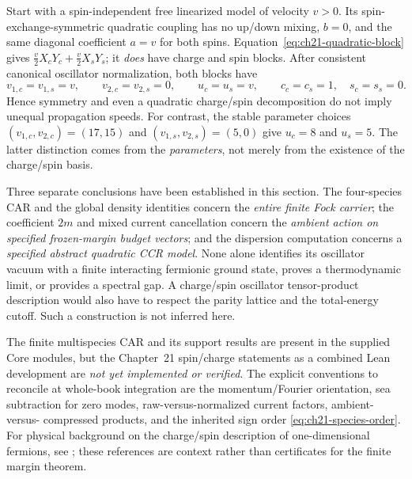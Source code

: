 \begin{example}
\label{ex:ch21-equal-speeds}
Start with a spin-independent free linearized model of velocity
$v>0$.  Its spin-exchange-symmetric quadratic coupling has no
up/down mixing, $b=0$, and the same diagonal coefficient $a=v$
for both spins.  Equation~\eqref{eq:ch21-quadratic-block} gives
$\tfrac v2 X_cY_c+\tfrac v2 X_sY_s$; it \emph{does} have charge
and spin blocks.  After consistent canonical oscillator
normalization, both blocks have
\begin{equation*}
  v_{1,c}=v_{1,s}=v,\qquad v_{2,c}=v_{2,s}=0,
  \qquad u_c=u_s=v,
  \qquad c_c=c_s=1,\quad s_c=s_s=0.
\end{equation*}
Hence symmetry and even a quadratic charge/spin decomposition do not
imply unequal propagation speeds.  For contrast, the stable parameter
choices $(v_{1,c},v_{2,c})=(17,15)$ and
$(v_{1,s},v_{2,s})=(5,0)$ give $u_c=8$ and $u_s=5$.
The latter distinction comes from the \emph{parameters}, not merely
from the existence of the charge/spin basis.
\end{example}

\begin{remark}
\label{rem:ch21-formalization-scope}
Three separate conclusions have been established in this section.
The four-species CAR and the global density identities concern the
\emph{entire finite Fock carrier}; the coefficient $2m$ and mixed
current cancellation concern the \emph{ambient action on specified
frozen-margin budget vectors}; and the dispersion computation
concerns a \emph{specified abstract quadratic CCR model}.  None
alone identifies its oscillator vacuum with a finite interacting
fermionic ground state, proves a thermodynamic limit, or provides a
spectral gap.  A charge/spin oscillator tensor-product description
would also have to respect the parity lattice and the total-energy
cutoff.  Such a construction is not inferred here.

The finite multispecies CAR and its support results are present in
the supplied Core modules, but the Chapter~21 spin/charge statements
as a combined Lean development are \emph{not yet implemented or
verified}.  The explicit conventions to reconcile at whole-book
integration are the momentum/Fourier orientation, sea subtraction for
zero modes, raw-versus-normalized current factors, ambient-versus-
compressed products, and the inherited sign order
\eqref{eq:ch21-species-order}.  For physical background on the
charge/spin description of one-dimensional fermions, see
\cite{giamarchi2004,gogolin1998,vondelft1998}; these references
are context rather than certificates for the finite margin theorem.
\end{remark}
